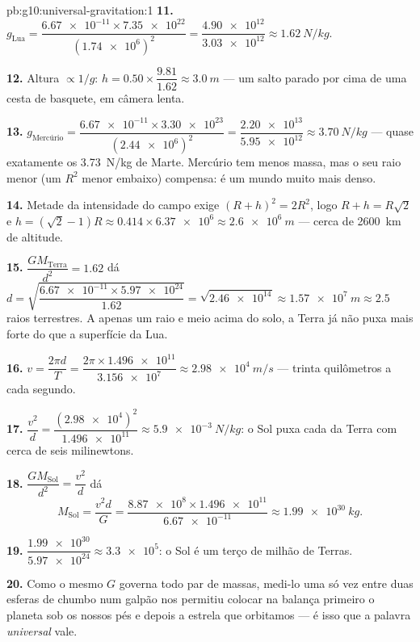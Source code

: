 \begin{solution}{pb:g10:universal-gravitation:1}
\textbf{11.} $g_{\text{Lua}} = \dfrac{\num{6.67e-11} \times
\num{7.35e22}}{(\num{1.74e6})^2} = \dfrac{\num{4.90e12}}
{\num{3.03e12}} \approx \qty{1.62}{N/kg}$.

\textbf{12.} Altura $\propto 1/g$:
$h = 0.50 \times \dfrac{9.81}{1.62} \approx \qty{3.0}{m}$ --- um salto
parado por cima de uma cesta de basquete, em câmera lenta.

\textbf{13.} $g_{\text{Mercúrio}} = \dfrac{\num{6.67e-11} \times
\num{3.30e23}}{(\num{2.44e6})^2} = \dfrac{\num{2.20e13}}
{\num{5.95e12}} \approx \qty{3.70}{N/kg}$ --- quase exatamente os
\qty{3.73}{N/kg} de Marte. Mercúrio tem menos massa, mas o seu raio menor
(um $R^2$ menor embaixo) compensa: é um mundo muito mais denso.

\textbf{14.} Metade da intensidade do campo exige
$(R + h)^2 = 2 R^2$, logo $R + h = R\sqrt{2}$ e
$h = (\sqrt{2} - 1) R \approx 0.414 \times \num{6.37e6}
\approx \qty{2.6e6}{m}$ --- cerca de \qty{2600}{km} de altitude.

\textbf{15.} $\dfrac{G M_{\text{Terra}}}{d^2} = 1.62$ dá
$d = \sqrt{\dfrac{\num{6.67e-11} \times \num{5.97e24}}{1.62}}
= \sqrt{\num{2.46e14}} \approx \qty{1.57e7}{m} \approx 2.5$ raios
terrestres. A apenas um raio e meio acima do solo, a Terra já não puxa
mais forte do que a superfície da Lua.

\textbf{16.} $v = \dfrac{2\pi d}{T}
= \dfrac{2\pi \times \num{1.496e11}}{\num{3.156e7}}
\approx \qty{2.98e4}{m/s}$ --- trinta quilômetros a cada segundo.

\textbf{17.} $\dfrac{v^2}{d} = \dfrac{(\num{2.98e4})^2}{\num{1.496e11}}
\approx \qty{5.9e-3}{N/kg}$: o Sol puxa cada  da Terra com
cerca de seis milinewtons.

\textbf{18.} $\dfrac{G M_{\text{Sol}}}{d^2} = \dfrac{v^2}{d}$ dá
\[
M_{\text{Sol}} = \frac{v^2 d}{G}
= \frac{\num{8.87e8} \times \num{1.496e11}}{\num{6.67e-11}}
\approx \qty{1.99e30}{kg}.
\]

\textbf{19.} $\dfrac{\num{1.99e30}}{\num{5.97e24}} \approx
\num{3.3e5}$: o Sol é um terço de milhão de Terras.

\textbf{20.} Como o mesmo $G$ governa todo par de massas, medi-lo uma só
vez entre duas esferas de chumbo num galpão nos permitiu colocar na
balança primeiro o planeta sob os nossos pés e depois a estrela que
orbitamos --- é isso que a palavra \emph{universal} vale.
\end{solution}
